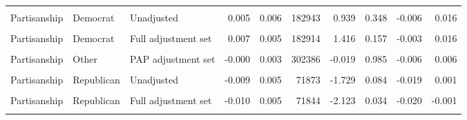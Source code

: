 \begin{table}
\begin{tabular}[t]{lllrrrrrrr}
\cellcolor{gray!10}{Margin} & \cellcolor{gray!10}{Vote margin more than 3pp} & \cellcolor{gray!10}{Full adjustment set} & \cellcolor{gray!10}{-0.000} & \cellcolor{gray!10}{0.002} & \cellcolor{gray!10}{662191} & \cellcolor{gray!10}{-0.019} & \cellcolor{gray!10}{0.985} & \cellcolor{gray!10}{-0.004} & \cellcolor{gray!10}{0.004}\\
Partisanship & Democrat & Unadjusted & 0.005 & 0.006 & 182943 & 0.939 & 0.348 & -0.006 & 0.016\\
\cellcolor{gray!10}{Partisanship} & \cellcolor{gray!10}{Democrat} & \cellcolor{gray!10}{PAP adjustment set} & \cellcolor{gray!10}{0.008} & \cellcolor{gray!10}{0.005} & \cellcolor{gray!10}{182940} & \cellcolor{gray!10}{1.585} & \cellcolor{gray!10}{0.113} & \cellcolor{gray!10}{-0.002} & \cellcolor{gray!10}{0.017}\\
Partisanship & Democrat & Full adjustment set & 0.007 & 0.005 & 182914 & 1.416 & 0.157 & -0.003 & 0.016\\
\cellcolor{gray!10}{Partisanship} & \cellcolor{gray!10}{Other} & \cellcolor{gray!10}{Unadjusted} & \cellcolor{gray!10}{-0.000} & \cellcolor{gray!10}{0.003} & \cellcolor{gray!10}{302389} & \cellcolor{gray!10}{-0.013} & \cellcolor{gray!10}{0.990} & \cellcolor{gray!10}{-0.007} & \cellcolor{gray!10}{0.007}\\
Partisanship & Other & PAP adjustment set & -0.000 & 0.003 & 302386 & -0.019 & 0.985 & -0.006 & 0.006\\
\cellcolor{gray!10}{Partisanship} & \cellcolor{gray!10}{Other} & \cellcolor{gray!10}{Full adjustment set} & \cellcolor{gray!10}{0.000} & \cellcolor{gray!10}{0.003} & \cellcolor{gray!10}{302360} & \cellcolor{gray!10}{0.037} & \cellcolor{gray!10}{0.970} & \cellcolor{gray!10}{-0.006} & \cellcolor{gray!10}{0.006}\\
Partisanship & Republican & Unadjusted & -0.009 & 0.005 & 71873 & -1.729 & 0.084 & -0.019 & 0.001\\
\cellcolor{gray!10}{Partisanship} & \cellcolor{gray!10}{Republican} & \cellcolor{gray!10}{PAP adjustment set} & \cellcolor{gray!10}{-0.010} & \cellcolor{gray!10}{0.005} & \cellcolor{gray!10}{71870} & \cellcolor{gray!10}{-2.003} & \cellcolor{gray!10}{0.045} & \cellcolor{gray!10}{-0.019} & \cellcolor{gray!10}{-0.000}\\
Partisanship & Republican & Full adjustment set & -0.010 & 0.005 & 71844 & -2.123 & 0.034 & -0.020 & -0.001\\
\cellcolor{gray!10}{Partisanship} & \cellcolor{gray!10}{Unknown} & \cellcolor{gray!10}{Unadjusted} & \cellcolor{gray!10}{-0.000} & \cellcolor{gray!10}{0.002} & \cellcolor{gray!10}{1442069} & \cellcolor{gray!10}{-0.276} & \cellcolor{gray!10}{0.783} & \cellcolor{gray!10}{-0.004} & \cellcolor{gray!10}{0.003}\\

\end{tabular}
\end{table}

